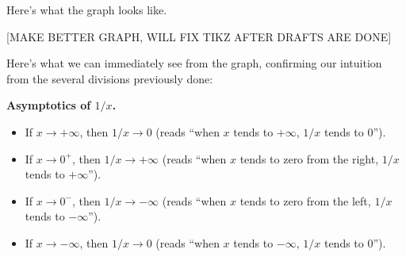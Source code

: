 \documentclass{ximera}
\begin{document}
Here's what the graph looks like.






[MAKE BETTER GRAPH, WILL FIX TIKZ AFTER DRAFTS ARE DONE]

Here's what we can immediately see from the graph, confirming our intuition from the several divisions previously done:

\begin{callout}
  {\bf Asymptotics of $1/x$.}
  \begin{itemize}
  \item If $x \to +\infty$, then $1/x \to 0$ (reads ``when $x$ tends to $+\infty$, $1/x$ tends to $0$'').
  \item If $x \to 0^+$, then $1/x \to +\infty$ (reads ``when $x$ tends to zero from the right, $1/x$ tends to $+\infty$'').
  \item If $x \to 0^-$, then $1/x \to -\infty$ (reads ``when $x$ tends to zero from the left, $1/x$ tends to $-\infty$'').
  \item If $x \to -\infty$, then $1/x \to 0$ (reads ``when $x$ tends to $-\infty$, $1/x$ tends to $0$'').
  \end{itemize}
\end{callout}
\end{document}
